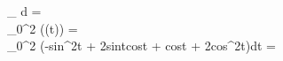 \int_\gamma {} \cdot d =\\
\int_0^{2\pi} (\gamma(t)) \cdot {} =\\
\int_0^{2\pi} (-sin^2t + 2sintcost + cost + 2cos^2t)dt =\\
\pi